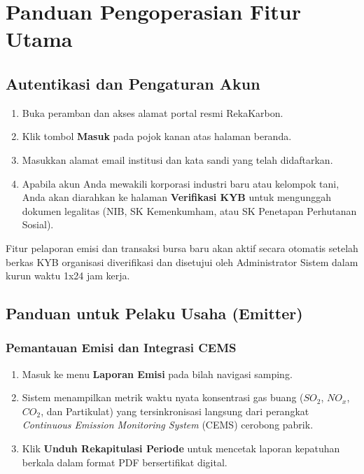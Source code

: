 \section{Panduan Pengoperasian Fitur Utama}

\subsection{Autentikasi dan Pengaturan Akun}
\begin{enumerate}
    \item Buka peramban dan akses alamat portal resmi RekaKarbon.
    \item Klik tombol \textbf{Masuk} pada pojok kanan atas halaman beranda.
    \item Masukkan alamat email institusi dan kata sandi yang telah didaftarkan.
    \item Apabila akun Anda mewakili korporasi industri baru atau kelompok tani, Anda akan diarahkan ke halaman \textbf{Verifikasi KYB} untuk mengunggah dokumen legalitas (NIB, SK Kemenkumham, atau SK Penetapan Perhutanan Sosial).
\end{enumerate}

\begin{infobox}
Fitur pelaporan emisi dan transaksi bursa baru akan aktif secara otomatis setelah berkas KYB organisasi diverifikasi dan disetujui oleh Administrator Sistem dalam kurun waktu 1x24 jam kerja.
\end{infobox}

\subsection{Panduan untuk Pelaku Usaha (Emitter)}

\subsubsection{Pemantauan Emisi dan Integrasi CEMS}
\begin{enumerate}
    \item Masuk ke menu \textbf{Laporan Emisi} pada bilah navigasi samping.
    \item Sistem menampilkan metrik waktu nyata konsentrasi gas buang ($SO_2$, $NO_x$, $CO_2$, dan Partikulat) yang tersinkronisasi langsung dari perangkat \textit{Continuous Emission Monitoring System} (CEMS) cerobong pabrik.
    \item Klik \textbf{Unduh Rekapitulasi Periode} untuk mencetak laporan kepatuhan berkala dalam format PDF bersertifikat digital.
\end{enumerate}

